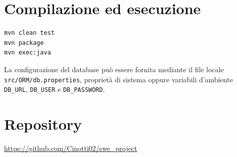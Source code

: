 \documentclass[12pt,a4paper]{article}
\newcommand{\code}[1]{\nolinkurl{#1}}
\begin{document}
\appendix

\section{Compilazione ed esecuzione}

\begin{lstlisting}[style=codeStyle,language=bash,
caption={Comandi Maven principali.}]
mvn clean test
mvn package
mvn exec:java
\end{lstlisting}

La configurazione del database può essere fornita mediante il file locale
\code{src/ORM/db.properties}, proprietà di sistema oppure variabili d'ambiente
\code{DB\_URL}, \code{DB\_USER} e \code{DB\_PASSWORD}.

\section{Repository}

\url{https://github.com/Cinotti02/swe_project}
\end{document}
